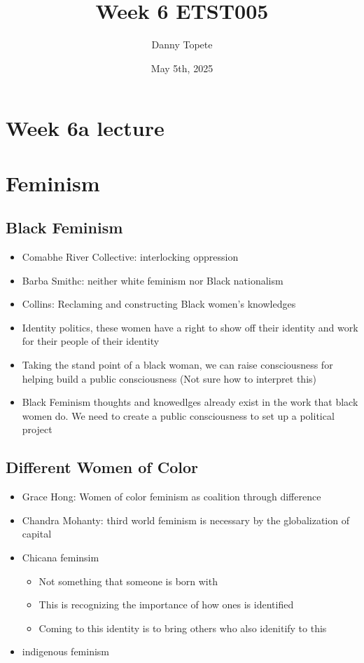 \documentclass{article}
\title{Week 6 ETST005}
\author{Danny Topete}
\date{May 5th, 2025}
\begin{document}
\maketitle

\section*{Week 6a lecture}

\section{Feminism}

\subsection{Black Feminism}
\begin{itemize}
  \item Comabhe River Collective:
    interlocking oppression
  \item Barba Smithc: neither white feminism nor Black nationalism
  \item Collins: Reclaming and constructing Black women's knowledges
  \item Identity politics, these women have a right to show off their
    identity and work for their people of their identity
  \item Taking the stand point of a black woman, we can raise consciousness
    for helping build a public consciousness (Not sure how to interpret this)
  \item Black Feminism thoughts and knowedlges already exist in the work that
    black women do. We need to create a public consciousness to set up
    a political project
\end{itemize}

\subsection{Different Women of Color}
\begin{itemize}
  
  \item Grace Hong: Women of color feminism as coalition through difference
  \item Chandra Mohanty: third world feminism is necessary by the globalization of capital
  \item Chicana feminsim
    \begin{itemize}
      \item Not something that someone is born with
      \item This is recognizing the importance of how ones is identified
      \item Coming to this identity is to bring others who also idenitify
        to this
    \end{itemize}
  \item indigenous feminism
\end{itemize}
\end{document}

